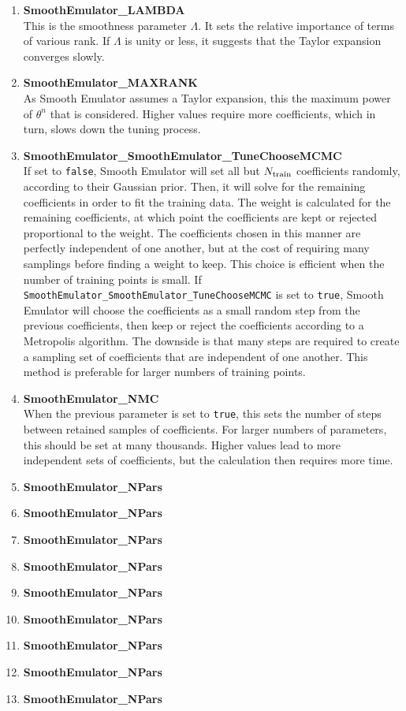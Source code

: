 \documentclass[main.tex]{subfiles}
\begin{document}
\begin{enumerate}\itemsep 0pt
\item {\bf SmoothEmulator\_LAMBDA}\\
This is the smoothness parameter $\Lambda$. It sets the relative importance of terms of various rank. If $\Lambda$ is unity or less, it suggests that the Taylor expansion converges slowly.
\item {\bf SmoothEmulator\_MAXRANK}\\
As Smooth Emulator assumes a Taylor expansion, this the maximum power of $\theta^n$ that is considered. Higher values require more coefficients, which in turn, slows down the tuning process.
\item {\bf SmoothEmulator\_SmoothEmulator_TuneChooseMCMC}\\
If set to {\tt false}, Smooth Emulator will set all but $N_{\rm train}$ coefficients randomly, according to their Gaussian prior. Then, it will solve for the remaining coefficients in order to fit the training data. The weight is calculated for the remaining coefficients, at which point the coefficients are kept or rejected proportional to the weight. The coefficients chosen in this manner are perfectly independent of one another, but at the cost of requiring many samplings before finding a weight to keep. This choice is efficient when the number of training points is small. If {\tt SmoothEmulator\_SmoothEmulator_TuneChooseMCMC} is set to {\tt true}, Smooth Emulator will choose the coefficients as a small random step from the previous coefficients, then keep or reject the coefficients according to a Metropolis algorithm. The downside is that many steps are required to create a sampling set of coefficients that are independent of one another. This method is preferable for larger numbers of training points. 
\item {\bf SmoothEmulator\_NMC}\\
When the previous parameter is set to {\tt true}, this sets the number of steps between retained samples of coefficients. For larger numbers of parameters, this should be set at many thousands. Higher values lead to more independent sets of coefficients, but the calculation then requires more time.  
\item {\bf SmoothEmulator\_NPars}\\
\item {\bf SmoothEmulator\_NPars}\\
\item {\bf SmoothEmulator\_NPars}\\
\item {\bf SmoothEmulator\_NPars}\\
\item {\bf SmoothEmulator\_NPars}\\
\item {\bf SmoothEmulator\_NPars}\\
\item {\bf SmoothEmulator\_NPars}\\
\item {\bf SmoothEmulator\_NPars}\\
\item {\bf SmoothEmulator\_NPars}\\

\end{enumerate}
\end{document}

